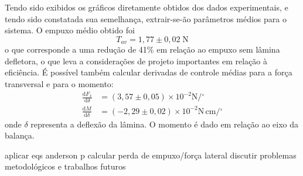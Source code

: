 Tendo sido exibidos os gráficos diretamente obtidos dos dados experimentais, e tendo sido constatada sua semelhança, extrair-se-ão parâmetros médios para o sistema. O empuxo médio obtido foi 
\begin{equation}
    T_{av} = 1,77 \pm 0,02\;\mathrm{N}
\end{equation}
o que corresponde a uma redução de 41\% em relação ao empuxo sem lâmina defletora, o que leva a considerações de projeto importantes em relação à eficiência. É possível também calcular derivadas de controle médias para a força transversal e para o momento:
\begin{align}
    \frac{\mathrm{d}F_x}{\mathrm{d}\delta} &= (3,57 \pm 0,05)\times10^{-2} \mathrm{N} / \mathrm{^\circ} \\
    \frac{\mathrm{d}M}{\mathrm{d}\delta} &= (-2,29 \pm 0,02)\times10^{-2} \mathrm{N}\,\mathrm{cm} / \mathrm{^\circ}
\end{align}
onde \(\delta \) representa a deflexão da lâmina. O momento é dado em relação ao eixo da balança.\ 

aplicar eqs anderson p calcular perda de empuxo/força lateral
discutir problemas metodológicos e trabalhos futuros
